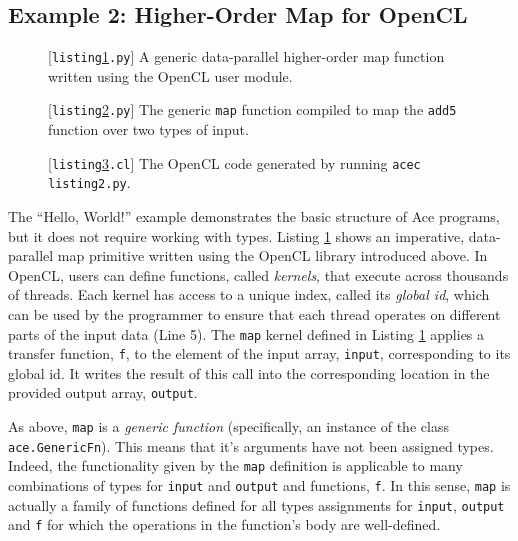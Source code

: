 \documentclass[10pt]{sigplanconf}
\begin{document}
\subsection{Example 2: Higher-Order Map for OpenCL}
\begin{figure}

\caption{[\texttt{listing\ref{map}.py}] A generic data-parallel higher-order map function written using the OpenCL user module.}
\label{map}
\end{figure}

\begin{figure}

\caption{[\texttt{listing\ref{mapadd5dbl}.py}] The generic \texttt{map} function compiled to map the \texttt{add5} function over two  types of input.}
\label{mapadd5dbl}
\end{figure}

\begin{figure}

\caption{[\texttt{listing\ref{mapout}.cl}] The OpenCL code generated by running \texttt{acec listing2.py}.}
\label{mapout}
\end{figure}

The ``Hello, World!'' example demonstrates the basic structure of Ace programs, but it does not require working with types. Listing \ref{map} shows an imperative, data-parallel map primitive written using the OpenCL library introduced above. In OpenCL, users can define functions, called {\em kernels}, that execute across thousands of threads. Each kernel has access to a unique index, called its {\em global id}, which can be used by the programmer to ensure that each thread operates on different parts of the input data (Line 5). The \verb|map| kernel defined in Listing \ref{map} applies a transfer function, \verb|f|, to the element of the input array, \verb|input|, corresponding to its global id. It writes the result of this call into the corresponding location in the provided output array, \verb|output|.

As above, \verb|map| is a {\em generic function} (specifically, an instance of the class \verb|ace.GenericFn|). This means that it's arguments have not been assigned types. Indeed, the functionality given by the \verb|map| definition is applicable to many combinations of types for \verb|input| and \verb|output| and functions, \verb|f|. In this sense, \verb|map| is actually a family of functions defined for all types assignments for \verb|input|, \verb|output| and \verb|f| for which the operations in the function's body are well-defined.
\end{document}
